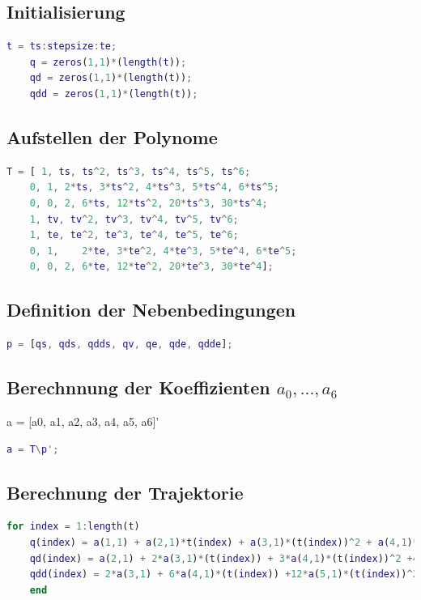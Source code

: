 \subsection{Initialisierung}
%
\begin{lstlisting}[language=Matlab, numbers=none]
	t = ts:stepsize:te;
	q = zeros(1,1)*(length(t));
	qd = zeros(1,1)*(length(t));
	qdd = zeros(1,1)*(length(t));
\end{lstlisting}
%
\subsection{Aufstellen der Polynome}
%
\begin{lstlisting}[language=Matlab, numbers=none]
	T = [ 1, ts, ts^2, ts^3, ts^4, ts^5, ts^6;
	0, 1, 2*ts, 3*ts^2, 4*ts^3, 5*ts^4, 6*ts^5;
	0, 0, 2, 6*ts, 12*ts^2, 20*ts^3, 30*ts^4;
	1, tv, tv^2, tv^3, tv^4, tv^5, tv^6;
	1, te, te^2, te^3, te^4, te^5, te^6;
	0, 1, 	 2*te, 3*te^2, 4*te^3, 5*te^4, 6*te^5;
	0, 0, 2, 6*te, 12*te^2, 20*te^3, 30*te^4];
\end{lstlisting}
%
\subsection{Definition der Nebenbedingungen}
%
\begin{lstlisting}[language=Matlab, numbers=none]
	p = [qs, qds, qdds, qv, qe, qde, qdde];
\end{lstlisting}
%
\subsection{Berechnnung der Koeffizienten $a_0,...,a_6$}
%
\begin{par}
	a = [a0, a1, a2, a3, a4, a5, a6]'
\end{par} \vspace{1em}
\begin{lstlisting}[language=Matlab, numbers=none]
	a = T\p';
\end{lstlisting}
%
\subsection{Berechnung der Trajektorie}
%
\begin{lstlisting}[language=Matlab, numbers=none]
	for index = 1:length(t)
	q(index) = a(1,1) + a(2,1)*t(index) + a(3,1)*(t(index))^2 + a(4,1)*(t(index))^3 +a(5,1)*(t(index))^4 + a(6,1)*(t(index))^5 + a(7,1)*(t(index))^6;
	qd(index) = a(2,1) + 2*a(3,1)*(t(index)) + 3*a(4,1)*(t(index))^2 +4*a(5,1)*(t(index))^3 + 5*a(6,1)*(t(index))^4 + 6*a(7,1)*(t(index))^5;
	qdd(index) = 2*a(3,1) + 6*a(4,1)*(t(index)) +12*a(5,1)*(t(index))^2 + 20*a(6,1)*(t(index))^3 + 30*a(7,1)*(t(index))^4;
	end
\end{lstlisting}
%
\setcounter{section}{4}
